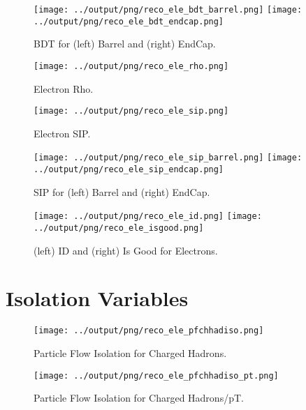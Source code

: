 \documentclass[11pt]{book}
\begin{document}
\begin{figure}[htb]
\centering
\texttt{[image: ../output/png/reco\_ele\_bdt\_barrel.png]}
\texttt{[image: ../output/png/reco\_ele\_bdt\_endcap.png]}
\caption{BDT for (left) Barrel and (right) EndCap.}
\label{fig:reco_ele_bdt_regions}
\end{figure}

\begin{figure}[htb]
\centering
\texttt{[image: ../output/png/reco\_ele\_rho.png]}
\caption{Electron Rho.}
\label{fig:reco_ele_rho}
\end{figure}

\begin{figure}[htb]
\centering
\texttt{[image: ../output/png/reco\_ele\_sip.png]}
\caption{Electron SIP.}
\label{fig:reco_ele_sip}
\end{figure}

\begin{figure}[htb]
\centering
\texttt{[image: ../output/png/reco\_ele\_sip\_barrel.png]}
\texttt{[image: ../output/png/reco\_ele\_sip\_endcap.png]}
\caption{SIP for (left) Barrel and (right) EndCap.}
\label{fig:reco_ele_sip_regions}
\end{figure}

\begin{figure}[htb]
\centering
\texttt{[image: ../output/png/reco\_ele\_id.png]}
\texttt{[image: ../output/png/reco\_ele\_isgood.png]}
\caption{(left) ID and (right) Is Good for Electrons.}
\label{fig:reco_ele_id_isgood}
\end{figure}
\clearpage

\section{Isolation Variables}
\begin{figure}[htb]
\centering
\texttt{[image: ../output/png/reco\_ele\_pfchhadiso.png]}
\caption{Particle Flow Isolation for Charged Hadrons.}
\label{fig:reco_ele_pfchhadiso}
\end{figure}

\begin{figure}[htb]
\centering
\texttt{[image: ../output/png/reco\_ele\_pfchhadiso\_pt.png]}
\caption{Particle Flow Isolation for Charged Hadrons/pT.}
\label{fig:reco_ele_pfchhadiso_pt}
\end{figure}
\end{document}
